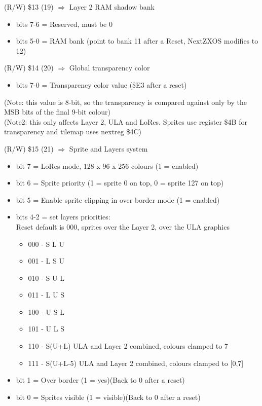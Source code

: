 (R/W) \$13 (19) $\Rightarrow$ Layer 2 RAM shadow bank
\begin{itemize}
\item[] bits 7-6 = Reserved, must be 0
\item[] bits 5-0 = RAM bank (point to bank 11 after a Reset, NextZXOS
  modifies to 12)
\end{itemize}

(R/W) \$14 (20) $\Rightarrow$ Global transparency color
\begin{itemize}
\item[] bits 7-0 = Transparency color value (\$E3 after a reset)
\end{itemize}
(Note: this value is 8-bit, so the transparency is compared against
only by the MSB bits of the final 9-bit colour)\\
(Note2: this only affects Layer 2, ULA and LoRes. Sprites use register
\$4B for transparency and tilemap uses nextreg \$4C)

(R/W) \$15 (21) $\Rightarrow$ Sprite and Layers system
\begin{itemize}
\item[] bit 7 = LoRes mode, 128 x 96 x 256 colours (1 = enabled)
\item[] bit 6 = Sprite priority (1 = sprite 0 on top, 0 = sprite 127 on top)
\item[] bit 5 = Enable sprite clipping in over border mode (1 = enabled)
\item[] bits 4-2 = set layers priorities:\\
  Reset default is 000, sprites over the Layer 2, over the ULA graphics
  \begin{itemize}
  \item[] 000 - S L U
  \item[] 001 - L S U
  \item[] 010 - S U L
  \item[] 011 - L U S
  \item[] 100 - U S L
  \item[] 101 - U L S
  \item[] 110 - S(U+L) ULA and Layer 2 combined, colours clamped to 7
  \item[] 111 - S(U+L-5) ULA and Layer 2 combined, colours clamped to [0,7]
  \end{itemize}
\item[] bit 1 = Over border (1 = yes)(Back to 0 after a reset)
\item[] bit 0 = Sprites visible (1 = visible)(Back to 0 after a reset)
\end{itemize}

